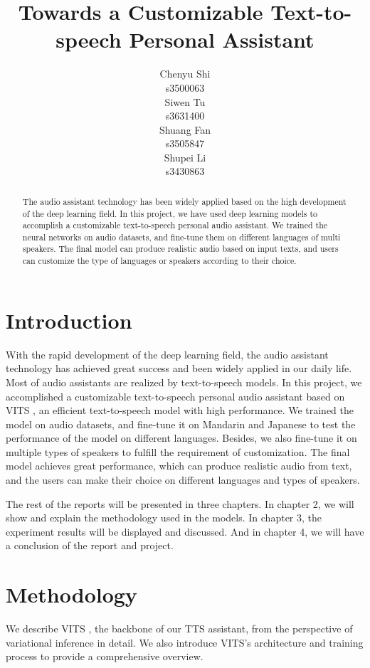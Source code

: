 \documentclass{article}
\title{Towards a Customizable Text-to-speech Personal Assistant}
\author{
 Chenyu Shi\\
   s3500063\\
   \And
 Siwen Tu\\
   s3631400\\
   \And
 Shuang Fan \\
   s3505847\\
   \And
 Shupei Li \\
   s3430863\\
}
\begin{document}
\maketitle
\begin{abstract}
The audio assistant technology has been widely applied based on the high development of the deep learning field. In this project, we have used deep learning models to accomplish a customizable text-to-speech personal audio assistant. We trained the neural networks on audio datasets, and fine-tune them on different languages of multi speakers. The final model can produce realistic audio based on input texts, and users can customize the type of languages or speakers according to their choice.
\end{abstract}




\section{Introduction}\label{sec:intro}
With the rapid development of the deep learning field, the audio assistant technology has achieved great success and been widely applied in our daily life. Most of audio assistants are realized by text-to-speech models. In this project, we accomplished a customizable text-to-speech personal audio assistant based on VITS \cite{2021kim}, an efficient text-to-speech model with high performance. We trained the model on audio datasets, and fine-tune it on Mandarin and Japanese to test the performance of the model on different languages. Besides, we also fine-tune it on multiple types of speakers to fulfill the requirement of customization. The final model achieves great performance, which can produce realistic audio from text, and the users can make their choice on different languages and types of speakers.

The rest of the reports will be presented in three chapters. In chapter 2,  we will show and explain the methodology used in the models. In chapter 3, the experiment results will be displayed and discussed. And in chapter 4, we will have a conclusion of the report and project.
\section{Methodology}
\label{sec:method}

We describe VITS \cite{2021kim}, the backbone of our TTS assistant, from the perspective of variational inference in detail. We also introduce VITS's architecture and training process to provide a comprehensive overview.
\end{document}
